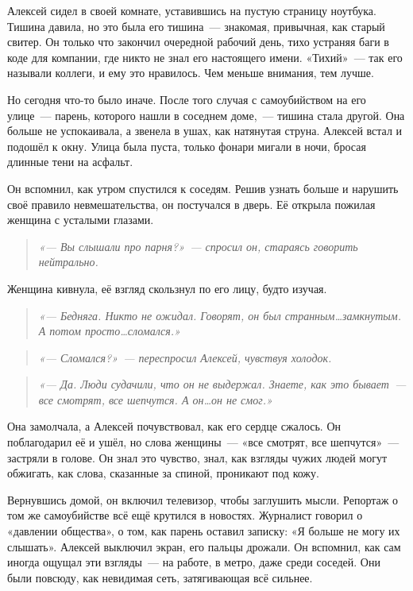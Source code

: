 \documentclass[12pt,a4paper]{book}
\newenvironment{dialogue}{\begin{quote}\itshape}{\end{quote}} %
\begin{document}
Алексей сидел в своей комнате, уставившись на пустую страницу ноутбука. Тишина давила, но это была его тишина~--- знакомая, привычная, как старый свитер. Он только что закончил очередной рабочий день, тихо устраняя баги в коде для компании, где никто не знал его настоящего имени. «Тихий»~--- так его называли коллеги, и ему это нравилось. Чем меньше внимания, тем лучше.

Но сегодня что-то было иначе. После того случая с самоубийством на его улице~--- парень, которого нашли в соседнем доме,~--- тишина стала другой. Она больше не успокаивала, а звенела в ушах, как натянутая струна. Алексей встал и подошёл к окну. Улица была пуста, только фонари мигали в ночи, бросая длинные тени на асфальт.

Он вспомнил, как утром спустился к соседям. Решив узнать больше и нарушить своё правило невмешательства, он постучался в дверь. Её открыла пожилая женщина с усталыми глазами.

\begin{dialogue}
«--- Вы слышали про парня?»~--- спросил он, стараясь говорить нейтрально.
\end{dialogue}

Женщина кивнула, её взгляд скользнул по его лицу, будто изучая.

\begin{dialogue}
«--- Бедняга. Никто не ожидал. Говорят, он был странным\ldots замкнутым. А потом просто\ldots сломался.»
\end{dialogue}

\begin{dialogue}
«--- Сломался?»~--- переспросил Алексей, чувствуя холодок.
\end{dialogue}

\begin{dialogue}
«--- Да. Люди судачили, что он не выдержал. Знаете, как это бывает~--- все смотрят, все шепчутся. А он\ldots он не смог.»
\end{dialogue}

Она замолчала, а Алексей почувствовал, как его сердце сжалось. Он поблагодарил её и ушёл, но слова женщины~--- «все смотрят, все шепчутся»~--- застряли в голове. Он знал это чувство, знал, как взгляды чужих людей могут обжигать, как слова, сказанные за спиной, проникают под кожу.

Вернувшись домой, он включил телевизор, чтобы заглушить мысли. Репортаж о том же самоубийстве всё ещё крутился в новостях. Журналист говорил о «давлении общества», о том, как парень оставил записку: «Я больше не могу их слышать». Алексей выключил экран, его пальцы дрожали. Он вспомнил, как сам иногда ощущал эти взгляды~--- на работе, в метро, даже среди соседей. Они были повсюду, как невидимая сеть, затягивающая всё сильнее.
\end{document}
